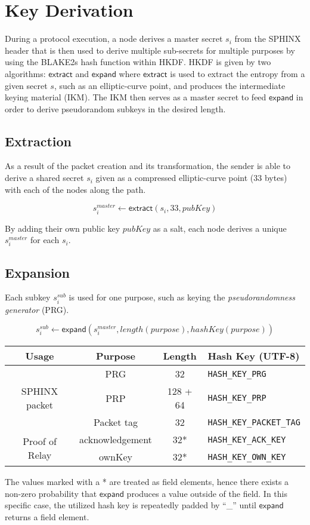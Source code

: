 \section{Key Derivation}
\label{appendix:keyderivation}

During a protocol execution, a node derives a master secret $s_i$ from the SPHINX header that is then used to derive multiple sub-secrets for multiple purposes by using the BLAKE2s hash function within HKDF. HKDF is given by two algorithms: $\mathsf{extract}$ and $\mathsf{expand}$ where $\mathsf{extract}$ is used to extract the entropy from a given secret $s$, such as an elliptic-curve point, and produces the intermediate keying material (IKM). The IKM then serves as a master secret to feed $\mathsf{expand}$ in order to derive pseudorandom subkeys in the desired length.

\subsection{Extraction}

As a result of the packet creation and its transformation, the sender is able to derive a shared secret $s_i$ given as a compressed elliptic-curve point (33 bytes) with each of the nodes along the path.

$$s_i^{master} \longleftarrow \mathsf{extract}(s_i, 33, pubKey)$$

By adding their own public key $pubKey$ as a salt, each node derives a unique $s_i^{master}$ for each $s_i$.

\subsection{Expansion}

Each subkey $s_i^{sub}$ is used for one purpose, such as keying the \textit{pseudorandomness generator} (PRG).

$$s_i^{sub} \longleftarrow \mathsf{expand}(s_i^{master}, length(purpose), hashKey(purpose))$$

\begin{center}
    \begin{tabular}{|c | c| c | l |}
        \hline
        Usage                           & Purpose         & Length   & Hash Key (UTF-8)                \\
        \hline
        \hline
        \multirow{3}{*}{SPHINX packet}  & PRG             & 32       & \texttt{HASH\_KEY\_PRG}         \\
                                        & PRP             & 128 + 64 & \texttt{HASH\_KEY\_PRP}         \\
                                        & Packet tag      & 32       & \texttt{HASH\_KEY\_PACKET\_TAG} \\
        \hline
        \multirow{2}{*}{Proof of Relay} & acknowledgement & 32*      & \texttt{HASH\_KEY\_ACK\_KEY}    \\
                                        & ownKey          & 32*      & \texttt{HASH\_KEY\_OWN\_KEY}    \\

        \hline
    \end{tabular}
\end{center}

The values marked with a * are treated as field elements, hence there exists a non-zero probability that $\mathsf{expand}$ produces a value outside of the field. In this specific case, the utilized hash key is repeatedly padded by ``\_'' until $\mathsf{expand}$ returns a field element.
